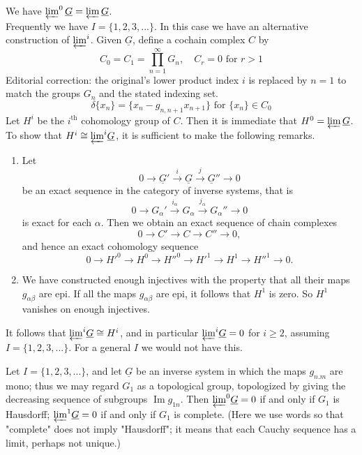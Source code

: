 \documentclass[../main]{subfiles}
\begin{document}
We have $\varprojlim^0\underline{G}=\varprojlim\underline{G}$. \\
Frequently we have $I=\{1,2,3,...\}$. In this case we have an alternative construction of ${\varprojlim}^i$. Given $\underline{G}$, define a cochain complex $C$ by 
\[C_0=C_1=\prod_{n=1}^\infty G_n,\quad C_r=0 \text{ for } r>1 \]
\noindent Editorial correction: the original's lower product index $i$ is replaced by $n=1$ to match the groups $G_n$ and the stated indexing set.
\[\delta\{x_n\}=\{x_n-g_{n,n+1}x_{n+1}\} \text{ for } \{x_n\}\in C_0\]
Let $H^i$ be the $i^\text{th}$ cohomology group of $C$. Then it is immediate that $H^0=\varprojlim\underline{G}$. To show that $H^i\cong{\varprojlim}^i\underline{G}$, it is sufficient to make the following remarks.
\begin{enumerate}[wide=\parindent]
    \item Let \[0\longrightarrow \underline{G}'\overset{i}{\longrightarrow}\underline{G}\overset{j}{\longrightarrow}\underline{G}''\longrightarrow 0\] be an exact sequence in the category of inverse systems, that is \\ \[0\longrightarrow G_\alpha'\overset{i_\alpha}{\longrightarrow}G_\alpha\overset{j_\alpha}{\longrightarrow}G_\alpha''\longrightarrow 0\] is exact for each $\alpha$. Then we obtain an exact sequence of chain complexes
    \[0\longrightarrow C'\longrightarrow C\longrightarrow C'' \longrightarrow 0,\]
    and hence an exact cohomology sequence
    \[0\longrightarrow {H'}^0\longrightarrow H^0\longrightarrow {H''}^0 \longrightarrow {H'}^1 \longrightarrow H^1 \longrightarrow {H''}^1 \longrightarrow 0.\]
    \item We have constructed enough injectives with the property that all their maps $g_{\alpha\beta}$ are epi. If all the maps $g_{\alpha\beta}$ are epi, it follows that $H^1$ is zero. So $H^1$ vanishes on enough injectives.
\end{enumerate}
\par It follows that ${\varprojlim}^i \underline{G}\cong H^i$, and in particular ${\varprojlim}^i\underline{G}=0$ for $i\geq 2$, assuming $I=\{1,2,3,...\}$. For a general $I$ we would not have this.
\begin{exercise} \label{ex:p3ch08.i}
Let $I=\{1,2,3,...\}$, and let $\underline{G}$ be an inverse system in which the maps $g_{n.m}$ are mono; thus we may regard $G_1$ as a topological group, topologized by giving the decreasing sequence of subgroups $\operatorname{Im}g_{1n}$. Then ${\varprojlim}^0\underline{G}=0$ if and only if $G_1$ is Hausdorff; ${\varprojlim}^1\underline{G}=0$ if and only if $G_1$ is complete. (Here we use words so that "complete" does not imply "Hausdorff"; it means that each Cauchy sequence has a limit, perhaps not unique.)
\end{exercise}
\end{document}
